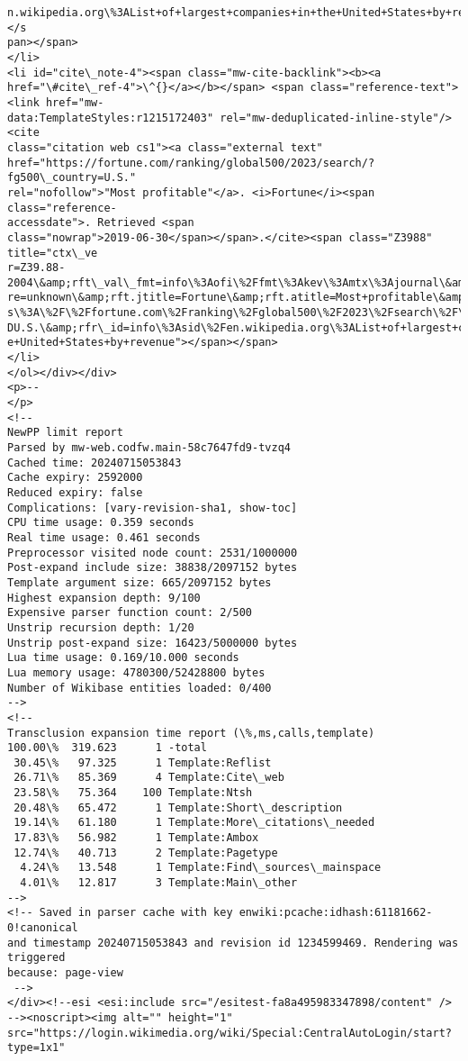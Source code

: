\documentclass[11pt]{article}
\begin{document}
\begin{Verbatim}[commandchars=\\\{\}]
n.wikipedia.org\%3AList+of+largest+companies+in+the+United+States+by+revenue"></s
pan></span>
</li>
<li id="cite\_note-4"><span class="mw-cite-backlink"><b><a
href="\#cite\_ref-4">\^{}</a></b></span> <span class="reference-text"><link href="mw-
data:TemplateStyles:r1215172403" rel="mw-deduplicated-inline-style"/><cite
class="citation web cs1"><a class="external text"
href="https://fortune.com/ranking/global500/2023/search/?fg500\_country=U.S."
rel="nofollow">"Most profitable"</a>. <i>Fortune</i><span class="reference-
accessdate">. Retrieved <span
class="nowrap">2019-06-30</span></span>.</cite><span class="Z3988" title="ctx\_ve
r=Z39.88-2004\&amp;rft\_val\_fmt=info\%3Aofi\%2Ffmt\%3Akev\%3Amtx\%3Ajournal\&amp;rft.gen
re=unknown\&amp;rft.jtitle=Fortune\&amp;rft.atitle=Most+profitable\&amp;rft\_id=http
s\%3A\%2F\%2Ffortune.com\%2Franking\%2Fglobal500\%2F2023\%2Fsearch\%2F\%3Ffg500\_country\%3
DU.S.\&amp;rfr\_id=info\%3Asid\%2Fen.wikipedia.org\%3AList+of+largest+companies+in+th
e+United+States+by+revenue"></span></span>
</li>
</ol></div></div>
<p>--
</p>
<!--
NewPP limit report
Parsed by mw‐web.codfw.main‐58c7647fd9‐tvzq4
Cached time: 20240715053843
Cache expiry: 2592000
Reduced expiry: false
Complications: [vary‐revision‐sha1, show‐toc]
CPU time usage: 0.359 seconds
Real time usage: 0.461 seconds
Preprocessor visited node count: 2531/1000000
Post‐expand include size: 38838/2097152 bytes
Template argument size: 665/2097152 bytes
Highest expansion depth: 9/100
Expensive parser function count: 2/500
Unstrip recursion depth: 1/20
Unstrip post‐expand size: 16423/5000000 bytes
Lua time usage: 0.169/10.000 seconds
Lua memory usage: 4780300/52428800 bytes
Number of Wikibase entities loaded: 0/400
-->
<!--
Transclusion expansion time report (\%,ms,calls,template)
100.00\%  319.623      1 -total
 30.45\%   97.325      1 Template:Reflist
 26.71\%   85.369      4 Template:Cite\_web
 23.58\%   75.364    100 Template:Ntsh
 20.48\%   65.472      1 Template:Short\_description
 19.14\%   61.180      1 Template:More\_citations\_needed
 17.83\%   56.982      1 Template:Ambox
 12.74\%   40.713      2 Template:Pagetype
  4.24\%   13.548      1 Template:Find\_sources\_mainspace
  4.01\%   12.817      3 Template:Main\_other
-->
<!-- Saved in parser cache with key enwiki:pcache:idhash:61181662-0!canonical
and timestamp 20240715053843 and revision id 1234599469. Rendering was triggered
because: page-view
 -->
</div><!--esi <esi:include src="/esitest-fa8a495983347898/content" />
--><noscript><img alt="" height="1"
src="https://login.wikimedia.org/wiki/Special:CentralAutoLogin/start?type=1x1"

\end{Verbatim}
\end{document}
